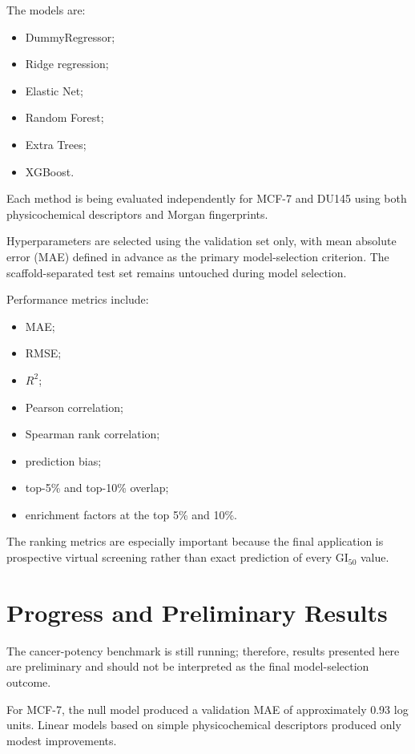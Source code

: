 \documentclass[11pt,a4paper]{article}
\begin{document}
The models are:

\begin{itemize}[leftmargin=1.6em]
    \item DummyRegressor;
    \item Ridge regression;
    \item Elastic Net;
    \item Random Forest;
    \item Extra Trees;
    \item XGBoost.
\end{itemize}

Each method is being evaluated independently for MCF-7 and DU145 using both physicochemical descriptors and Morgan fingerprints.

Hyperparameters are selected using the validation set only, with mean absolute error (MAE) defined in advance as the primary model-selection criterion. The scaffold-separated test set remains untouched during model selection.

Performance metrics include:

\begin{itemize}[leftmargin=1.6em]
    \item MAE;
    \item RMSE;
    \item $R^2$;
    \item Pearson correlation;
    \item Spearman rank correlation;
    \item prediction bias;
    \item top-5\% and top-10\% overlap;
    \item enrichment factors at the top 5\% and 10\%.
\end{itemize}

The ranking metrics are especially important because the final application is prospective virtual screening rather than exact prediction of every GI$_{50}$ value.

\section{Progress and Preliminary Results}

The cancer-potency benchmark is still running; therefore, results presented here are preliminary and should not be interpreted as the final model-selection outcome.

For MCF-7, the null model produced a validation MAE of approximately 0.93 log units. Linear models based on simple physicochemical descriptors produced only modest improvements.
\end{document}
